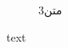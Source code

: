 \begin{figure}[htp]
\begin{subfigure}[b]{0.3\textwidth}
		\caption{متن3 }
		\label{fig:fig1-3}
	\end{subfigure}
	\caption{text}
	\label{fig:fig1}
	
\end{figure}
